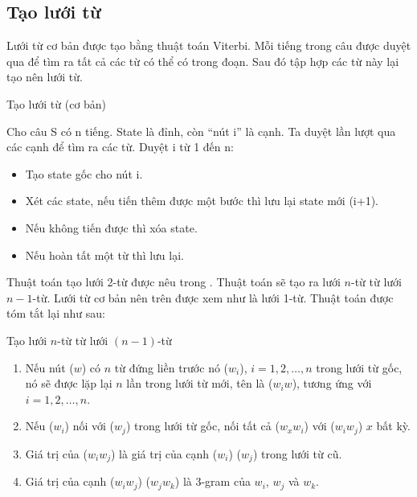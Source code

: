 \documentclass[a4paper,oneside,14pt]{extbook} %
\begin{document}
\subsection{Tạo lưới từ}
\label{sub:lattice:creation}

Lưới từ cơ bản được tạo bằng thuật toán Viterbi. Mỗi tiếng trong câu
được duyệt qua để tìm ra tất cả các từ có thể có trong đoạn. Sau đó
tập hợp các từ này lại tạo nên lưới từ.

\begin{algo}\caption{Tạo lưới từ (cơ bản)}
Cho câu S có n tiếng. State là đỉnh, còn ``nút i'' là cạnh. Ta duyệt
lần lượt qua các cạnh để tìm  ra các từ. Duyệt i từ 1 đến n:
\begin{itemize}
\item Tạo state gốc cho nút i.
\item Xét các state, nếu tiến thêm được một bước thì lưu lại state mới (i+1).
\item Nếu không tiến được thì xóa state.
\item Nếu hoàn tất một từ thì lưu lại.
\end{itemize}
\end{algo}

Thuật toán tạo lưới 2-từ được nêu trong \cite{Ravishankar}. Thuật toán
sẽ tạo ra lưới $n$-từ từ lưới $n-1$-từ. Lưới từ cơ bản nên trên được
xem như là lưới 1-từ. Thuật toán được tóm tắt lại như sau: 

\begin{algo}\caption{Tạo lưới $n$-từ từ lưới $(n-1)$-từ}
\begin{enumerate}
\item Nếu nút ($w$) có $n$ từ đứng liền trước nó ($w_i$),
  $i=1,2,\ldots{},n$ trong lưới từ gốc, nó sẽ được lặp lại $n$ lần trong
  lưới từ mới, tên là ($w_{i}w$), tương ứng với $i=1,2,\ldots{},n$.
\item Nếu ($w_i$) nối với ($w_j$) trong lưới từ gốc, nối tất cả
  ($w_xw_i$) với ($w_iw_j$) $x$ bất kỳ.
\item Giá trị của ($w_iw_j$) là giá trị của cạnh ($w_i$) ($w_j$) trong
  lưới từ cũ.
\item Giá trị của cạnh ($w_iw_j$) ($w_jw_k$) là 3-gram của $w_i$, $w_j$
  và $w_k$.
\end{enumerate}
\end{algo}

\end{document}
